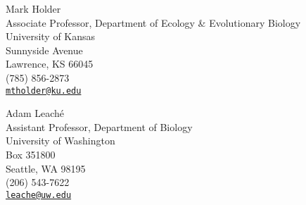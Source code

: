 
Mark Holder \\
\myIndent Associate Professor, Department of Ecology \& Evolutionary Biology \\
\myIndent University of Kansas \\
 Sunnyside Avenue \\
\myIndent Lawrence, KS 66045 \\
\myIndent (785) 856-2873 \\
\myIndent \href{mailto:mtholder@ku.edu}{\tt mtholder@ku.edu}


Adam Leach\'{e} \\
\myIndent Assistant Professor, Department of Biology \\
\myIndent University of Washington \\
\myIndent Box 351800 \\
\myIndent Seattle, WA 98195\\
\myIndent (206) 543-7622 \\
\myIndent \href{mailto:leache@uw.edu}{\tt leache@uw.edu}


